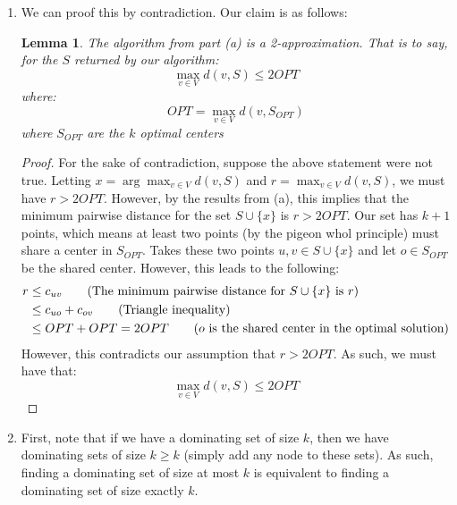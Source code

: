 \documentclass[12pt]{exam}
\newtheorem{lemma}[theorem]{Lemma}
\begin{document}
\begin{questions}
\begin{solution}
\begin{enumerate}[label=(\alph*)]
    Setting $i = k$, our lemma reads:

    Let $S$ be the set of $k$ returned by our algorithm. Let $r = \max_{v \in V} \{d(v, S) \}$ and $x = \arg\max_{v \in V} \{ d(v, S \}$. Then the set of $k + 1$ points $S \cup \{ x \}$ have minimum pairwise distance $r$.

    This is exactly what we wished to proof.

    \item
      We can proof this by contradiction. Our claim is as follows:
      \begin{lemma}
        The algorithm from part (a) is a 2-approximation. That is to say, for the $S$ returned by our algorithm:
        \[
          \max_{v \in V} d(v, S) \leq 2 OPT
        \]
        where:
        \[
          OPT = \max_{v \in V} d(v, S_{OPT})
        \]
        where $S_{OPT}$ are the $k$ optimal centers
      \end{lemma}
      \begin{proof}
        For the sake of contradiction, suppose the above statement were not true. Letting $x = \arg \max_{v \in V} d(v, S)$ and $r = \max_{v \in V} d(v, S)$, we must have $r > 2 OPT$. However, by the results from (a), this implies that the minimum pairwise distance for the set $S \cup \{x\}$ is $r > 2OPT$. Our set has $k + 1$ points, which means at least two points (by the pigeon whol principle) must share a center in $S_{OPT}$. Takes these two points $u, v \in S \cup \{x\}$ and let $o \in S_{OPT}$ be the shared center. However, this leads to the following:
        \begin{align*}
          r &\leq c_{uv} \tag{The minimum pairwise distance for $S \cup \{x\}$ is $r$} \\
          &\leq c_{uo} + c_{ov} \tag{Triangle inequality} \\
          &\leq OPT + OPT = 2OPT \tag{$o$ is the shared center in the optimal solution} \\
        \end{align*}
        However, this contradicts our assumption that $r > 2 OPT$. As such, we must have that:
        \[
          \max_{v \in V} d(v, S) \leq 2OPT
        \]
      \end{proof}
    \item
      First, note that if we have a dominating set of size $k$, then we have dominating sets of size $k \geq k$ (simply add any node to these sets). As such, finding a dominating set of size at most $k$ is equivalent to finding a dominating set of size exactly $k$.


\end{enumerate}
\end{solution}
\end{questions}
\end{document}
